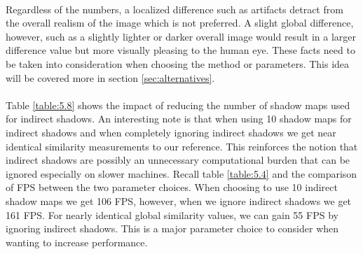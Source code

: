 \paragraph{}
Regardless of the numbers, a localized difference such as artifacts detract from the overall realism of the image which is not preferred.  A slight global difference, however, such as a slightly lighter or darker overall image would result in a larger difference value but more visually pleasing to the human eye.  These facts need to be taken into consideration when choosing the method or parameters.  This idea will be covered more in section \ref{sec:alternatives}.

\paragraph{}
Table \ref{table:5.8} shows the impact of reducing the number of shadow maps used for indirect shadows.  An interesting note is that when using 10 shadow maps for indirect shadows and when completely ignoring indirect shadows we get near identical similarity measurements to our reference.  This reinforces the notion that indirect shadows are possibly an unnecessary computational burden that can be ignored especially on slower machines.  Recall table \ref{table:5.4} and the comparison of FPS between the two parameter choices.  When choosing to use 10 indirect shadow maps we get 106 FPS, however, when we ignore indirect shadows we get 161 FPS.  For nearly identical global similarity values, we can gain 55 FPS by ignoring indirect shadows.  This is a major parameter choice to consider when wanting to increase performance.

